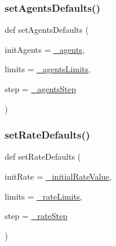 \subsubsection{\texorpdfstring{set\+Agents\+Defaults()}{setAgentsDefaults()}}
{\footnotesize\ttfamily def set\+Agents\+Defaults (\begin{DoxyParamCaption}\item[{}]{init\+Agents = {\ttfamily \hyperlink{class_mu_mo_t_1_1_mu_mo_t_1_1_mu_mo_tdefault_a42f05ec35f2b5b564e064bb19ebd36cf}{\+\_\+agents}},  }\item[{}]{limits = {\ttfamily \hyperlink{class_mu_mo_t_1_1_mu_mo_t_1_1_mu_mo_tdefault_a01360abcb6eddb212c38b66852c35e17}{\+\_\+agents\+Limits}},  }\item[{}]{step = {\ttfamily \hyperlink{class_mu_mo_t_1_1_mu_mo_t_1_1_mu_mo_tdefault_a55b7c54066a90600796a35e96ef5743b}{\+\_\+agents\+Step}} }\end{DoxyParamCaption})\hspace{0.3cm}{\ttfamily [static]}}

\mbox{\label{class_mu_mo_t_1_1_mu_mo_t_1_1_mu_mo_tdefault_a3ce665e68925e7c173896a5101b16dfa}} 
\subsubsection{\texorpdfstring{set\+Rate\+Defaults()}{setRateDefaults()}}
{\footnotesize\ttfamily def set\+Rate\+Defaults (\begin{DoxyParamCaption}\item[{}]{init\+Rate = {\ttfamily \hyperlink{class_mu_mo_t_1_1_mu_mo_t_1_1_mu_mo_tdefault_adbfda01292fc4c7936ed57523fd625c7}{\+\_\+initial\+Rate\+Value}},  }\item[{}]{limits = {\ttfamily \hyperlink{class_mu_mo_t_1_1_mu_mo_t_1_1_mu_mo_tdefault_a89f788e3d778e1e0554c57832275d484}{\+\_\+rate\+Limits}},  }\item[{}]{step = {\ttfamily \hyperlink{class_mu_mo_t_1_1_mu_mo_t_1_1_mu_mo_tdefault_aa45ec6be070d9881c9c018a533f6573c}{\+\_\+rate\+Step}} }\end{DoxyParamCaption})\hspace{0.3cm}{\ttfamily [static]}}

